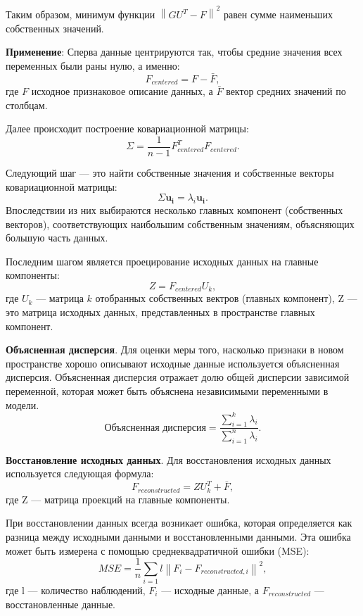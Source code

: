 Таким образом, минимум функции $\left\| GU^{T} - F \right\|^{2}$ равен сумме наименьших собственных значений.

\textbf{Применение}: Сперва данные центрируются так, чтобы средние значения всех переменных были раны нулю, а именно:
\begin{equation}
    F_{centered} = F - \bar{F},
\end{equation}
где $F$ исходное признаковое описание данных, а $\bar{F}$ вектор средних значений по столбцам.

Далее происходит построение ковариационной матрицы:
\begin{equation}
    \Sigma = \frac{1}{n-1}F_{centered}^{T}F_{centered}.
\end{equation}

Следующий шаг — это найти собственные значения и собственные векторы ковариационной матрицы:
\begin{equation}
    \Sigma \mathbf{u_i} = \lambda_i \mathbf{u_i}.
\end{equation}
Впоследствии из них выбираются несколько главных компонент (собственных векторов), соответствующих наибольшим собственным значениям, объясняющих большую часть данных.

Последним шагом является проецирование исходных данных на главные компоненты:
\begin{equation}
    Z = F_{centered}U_k,
\end{equation}
где $U_k$ — матрица $k$ отобранных собственных вектров (главных компонент), Z — это матрица исходных данных, представленных в пространстве главных компонент.

\textbf{Объясненная дисперсия}. Для оценки меры того, насколько признаки в новом пространстве хорошо описывают исходные данные используется объясненная дисперсия. Объясненная дисперсия отражает долю общей дисперсии зависимой переменной, которая может быть объяснена независимыми переменными в модели.
\begin{equation}
    \text{Объясненная дисперсия} = \frac{\sum_{i=1}^{k}\lambda_i}{\sum_{i=1}^{n}\lambda_i}.
\end{equation}

\textbf{Восстановление исходных данных}. Для восстановления исходных данных используется следующая формула:
\begin{equation}
    F_{reconstructed} = Z U_{k}^{T} + \bar{F},
\end{equation}
где Z — матрица проекций на главные компоненты.

При восстановлении данных всегда возникает ошибка, которая определяется как разница между исходными данными и восстановленными данными. Эта ошибка может быть измерена с помощью среднеквадратичной ошибки (MSE):
\begin{equation}
    MSE = \frac{1}{n} \sum_{i = 1}{l} \left\|F_i - F_{reconstructed, i} \right\|^{2},
\end{equation}
где l — количество наблюдений, $F_i$ — исходные данные, а $F_{reconstructed}$ — восстановленные данные.

